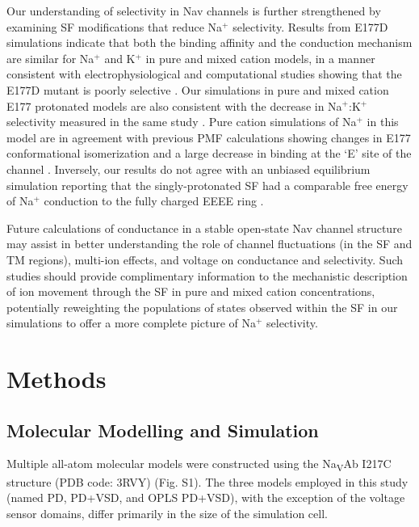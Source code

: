\begin{refsection}
Our understanding of selectivity in Nav channels is further strengthened by examining SF modifications that reduce Na$^+$ selectivity. Results from E177D simulations indicate that both the binding affinity and the conduction mechanism are similar for Na$^+$ and K$^+$ in pure and mixed cation models, in a manner consistent with electrophysiological and computational studies showing that the E177D mutant is poorly selective \cite{FinolUrdaneta:2014bz}. Our simulations in pure and mixed cation E177 protonated models are also consistent with the decrease in Na$^+$:K$^+$ selectivity measured in the same study \cite{FinolUrdaneta:2014bz}. Pure cation simulations of Na$^+$ in this model are in agreement with previous PMF calculations showing changes in E177 conformational isomerization and a large decrease in binding at the `E' site of the channel \cite{Furini:2014gv}. Inversely, our results do not agree with an unbiased equilibrium simulation reporting that the singly-protonated SF had a comparable free energy of Na$^+$ conduction to the fully charged EEEE ring  \cite{Boiteux:2014ut}.

Future calculations of conductance in a stable open-state Nav channel structure may assist in better understanding the role of channel fluctuations (in the SF and TM regions), multi-ion effects, and voltage on conductance and selectivity. Such studies should provide complimentary information to the mechanistic description of ion movement through the SF in pure and mixed cation concentrations, potentially reweighting the populations of states observed within the SF in our simulations to offer a more complete picture of Na$^+$ selectivity.

\section{Methods} 

\subsection{Molecular Modelling and Simulation} 

Multiple all-atom molecular models were constructed using the Na\textsubscript{V}Ab I217C structure (PDB code: 3RVY) \cite{Payandeh:2012ib} (Fig. S1). The three models employed in this study (named PD, PD+VSD, and OPLS PD+VSD), with the exception of the voltage sensor domains, differ primarily in the size of the simulation cell. %


\end{refsection}
